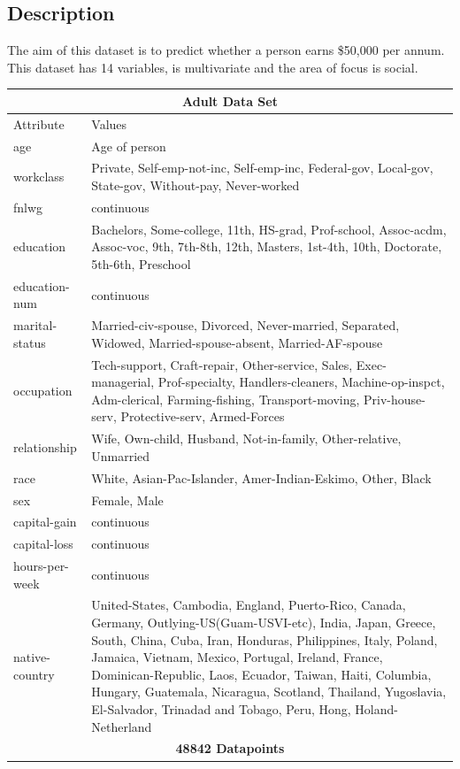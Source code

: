 \documentclass[12pt]{article}
\begin{document}
	\subsection{Description}
	The aim of this dataset is to predict whether a person earns \$50,000 per annum. This
	dataset has 14 variables, is multivariate and the area of focus is social.
	\begin{center}
		\begin{tabular}{|p{2cm}|p{12cm}|}
			\hline
			\multicolumn{2}{|c|}{\bfseries\Large Adult Data Set} \\
			\hline
			Attribute&Values\\
			\hline
			age&Age of person\\
			workclass&Private, Self-emp-not-inc, Self-emp-inc, Federal-gov, Local-gov, State-gov, Without-pay, Never-worked\\
			fnlwg&continuous\\
			education&Bachelors, Some-college, 11th, HS-grad, Prof-school, Assoc-acdm, Assoc-voc, 9th, 7th-8th, 12th, Masters, 1st-4th, 10th, Doctorate, 5th-6th, Preschool\\
			education-num&continuous\\
			marital-status&Married-civ-spouse, Divorced, Never-married, Separated, Widowed, Married-spouse-absent, Married-AF-spouse\\
			occupation&Tech-support, Craft-repair, Other-service, Sales, Exec-managerial, Prof-specialty, Handlers-cleaners, Machine-op-inspct, Adm-clerical, Farming-fishing, Transport-moving, Priv-house-serv, Protective-serv, Armed-Forces\\
			relationship&Wife, Own-child, Husband, Not-in-family, Other-relative, Unmarried\\
			race&White, Asian-Pac-Islander, Amer-Indian-Eskimo, Other, Black\\
			sex&Female, Male\\
			capital-gain&continuous\\
			capital-loss&continuous\\
			hours-per-week&continuous\\
			native-country&United-States, Cambodia, England, Puerto-Rico, Canada, Germany, Outlying-US(Guam-USVI-etc), India, Japan, Greece, South, China, Cuba, Iran, Honduras, Philippines, Italy, Poland, Jamaica, Vietnam, Mexico, Portugal, Ireland, France, Dominican-Republic, Laos, Ecuador, Taiwan, Haiti, Columbia, Hungary, Guatemala, Nicaragua, Scotland, Thailand, Yugoslavia, El-Salvador, Trinadad and Tobago, Peru, Hong, Holand-Netherland\\
			\hline
			\multicolumn{2}{|c|}{\bfseries\large 48842 Datapoints} \\
			\hline
		\end{tabular}
	\end{center}
\end{document}
